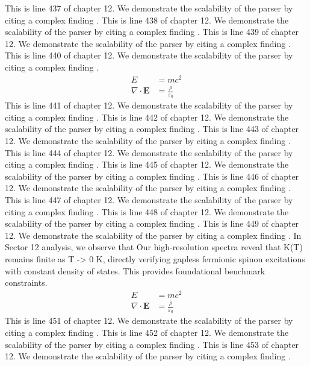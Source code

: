 This is line 437 of chapter 12. We demonstrate the scalability of the parser by citing a complex finding \cite{ref12_437}.
This is line 438 of chapter 12. We demonstrate the scalability of the parser by citing a complex finding \cite{ref12_438}.
This is line 439 of chapter 12. We demonstrate the scalability of the parser by citing a complex finding \cite{ref12_439}.
This is line 440 of chapter 12. We demonstrate the scalability of the parser by citing a complex finding \cite{ref12_440}.
\begin{align*}
  E &= mc^2 \\
  \nabla \cdot \mathbf{E} &= \frac{\rho}{\varepsilon_0}
\end{align*}
This is line 441 of chapter 12. We demonstrate the scalability of the parser by citing a complex finding \cite{ref12_441}.
This is line 442 of chapter 12. We demonstrate the scalability of the parser by citing a complex finding \cite{ref12_442}.
This is line 443 of chapter 12. We demonstrate the scalability of the parser by citing a complex finding \cite{ref12_443}.
This is line 444 of chapter 12. We demonstrate the scalability of the parser by citing a complex finding \cite{ref12_444}.
This is line 445 of chapter 12. We demonstrate the scalability of the parser by citing a complex finding \cite{ref12_445}.
This is line 446 of chapter 12. We demonstrate the scalability of the parser by citing a complex finding \cite{ref12_446}.
This is line 447 of chapter 12. We demonstrate the scalability of the parser by citing a complex finding \cite{ref12_447}.
This is line 448 of chapter 12. We demonstrate the scalability of the parser by citing a complex finding \cite{ref12_448}.
This is line 449 of chapter 12. We demonstrate the scalability of the parser by citing a complex finding \cite{ref12_449}.
In Sector 12 analysis, we observe that Our high-resolution spectra reveal that K(T) remains finite as T -> 0 K, directly verifying gapless fermionic spinon excitations with constant density of states. This provides foundational benchmark constraints.
\begin{align*}
  E &= mc^2 \\
  \nabla \cdot \mathbf{E} &= \frac{\rho}{\varepsilon_0}
\end{align*}
This is line 451 of chapter 12. We demonstrate the scalability of the parser by citing a complex finding \cite{ref12_451}.
This is line 452 of chapter 12. We demonstrate the scalability of the parser by citing a complex finding \cite{ref12_452}.
This is line 453 of chapter 12. We demonstrate the scalability of the parser by citing a complex finding \cite{ref12_453}.
